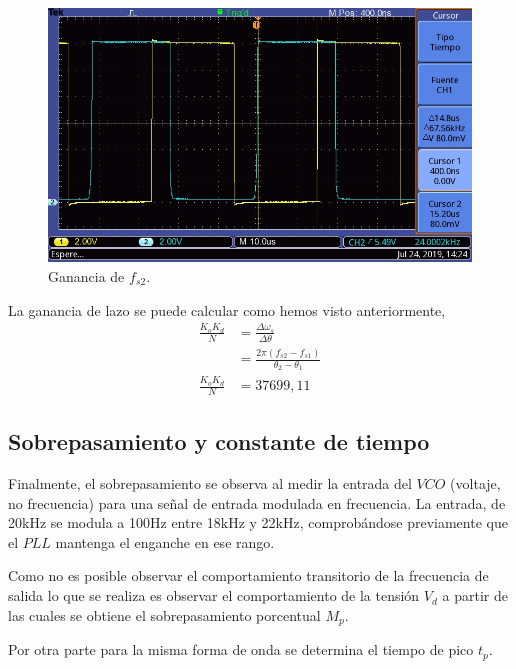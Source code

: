 \documentclass[twocolumn]{article}
\begin{document}
\begin{figure}[H]
  \centering    
  \includegraphics[width=\columnwidth]{imagenes/osc2.jpg}
  \caption{Ganancia de $f_{s2}$.}\label{fig:osc2}
\end{figure}

La ganancia de lazo se puede calcular como hemos visto anteriormente,
\begin{align*}
	\frac{K_o K_d}{N}  &= \frac{\Delta \omega_{s}}{\Delta \theta} \\
					   &= \frac{2 \pi (f_{s2} - f_{s1})} {\theta_2 - \theta_1} \\
	\frac{K_o K_d}{N}  &= 37699,11
\end{align*}

\subsection{Sobrepasamiento y constante de tiempo}
Finalmente, el sobrepasamiento se observa al medir la entrada del $VCO$ (voltaje, no frecuencia) para una señal de entrada modulada en frecuencia. La entrada, de 20kHz se modula a 100Hz entre 18kHz y 22kHz, comprobándose previamente que el $PLL$ mantenga el enganche en ese rango.

Como no es posible observar el comportamiento transitorio de la frecuencia de salida lo que se realiza es observar el comportamiento de la tensión $V_d$ a partir de las cuales se obtiene el sobrepasamiento porcentual $M_{p}$.

Por otra parte para la misma forma de onda se determina el tiempo de pico $t_p$. 
\end{document}
